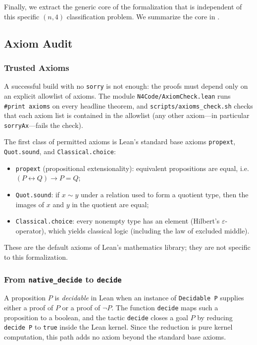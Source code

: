 \documentclass[12pt]{article}
\begin{document}
Finally, we extract the generic core of the formalization that is independent of this specific $(n,4)$ classification problem. We summarize the core in .

\subsection{Axiom Audit}
\label{sec:audit}
\subsubsection{Trusted Axioms}
\label{sec:axioms}

A successful build with no \texttt{sorry} is not enough: the proofs must
depend only on an explicit allowlist of axioms.
The module \texttt{N4Code/AxiomCheck.lean} runs \texttt{\#print axioms} on
every headline theorem, and \texttt{scripts/axioms\_check.sh} checks that
each axiom list is contained in the allowlist (any other axiom---in
particular \texttt{sorryAx}---fails the check).

The first class of permitted axioms is Lean's standard base axioms
\texttt{propext}, \texttt{Quot.sound}, and \texttt{Classical.choice}:
\begin{itemize}[nosep]
  \item \texttt{propext} (propositional extensionality): equivalent
        propositions are equal, i.e.\ $(P\leftrightarrow Q)\to P=Q$;
  \item \texttt{Quot.sound}: if $x\sim y$ under a relation used to form a
        quotient type, then the images of $x$ and $y$ in the quotient are
        equal;
  \item \texttt{Classical.choice}: every nonempty type has an element
        (Hilbert's $\varepsilon$-operator), which yields classical logic
        (including the law of excluded middle).
\end{itemize}
These are the default axioms of Lean's mathematics library; they are not
specific to this formalization.

\subsubsection[decide vs.\ native\_decide]{From \texttt{native\_decide} to \texttt{decide}}
\label{sec:native_decide_audit}
A proposition \(P\) is \emph{decidable} in Lean when an instance of
\texttt{Decidable P} supplies either a proof of \(P\) or a proof of
\(\neg P\). The function \texttt{decide} maps such a proposition to a
boolean, and the tactic \texttt{decide} closes a goal \(P\) by reducing
\texttt{decide P} to \texttt{true} inside the Lean kernel. Since the
reduction is pure kernel computation, this path adds no axiom beyond the
standard base axioms.
\end{document}

